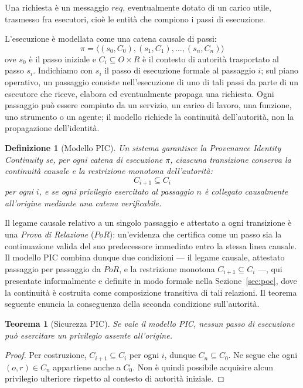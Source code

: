 \documentclass[11pt]{article}
\newtheorem{definition}{Definizione}
\newtheorem{theorem}{Teorema}
\begin{document}
Una richiesta è un messaggio $req$, eventualmente dotato di un carico utile,
trasmesso fra esecutori, cioè le entità che compiono i passi di esecuzione.

L'esecuzione è modellata come una catena causale di passi:
\[
\pi = \langle (s_0, C_0), (s_1, C_1), \dots, (s_n, C_n) \rangle
\]
ove $s_0$ è il passo iniziale e $C_i \subseteq O \times R$ è il contesto di
autorità trasportato al passo $s_i$. Indichiamo con $s_i$ il passo di esecuzione
formale al passaggio $i$; sul piano operativo, un passaggio consiste
nell'esecuzione di uno di tali passi da parte di un esecutore che riceve,
elabora ed eventualmente propaga una richiesta. Ogni passaggio può essere
compiuto da un servizio, un carico di lavoro, una funzione, uno strumento o un
agente; il modello richiede la continuità dell'autorità, non la propagazione
dell'identità.

\begin{definition}[Modello PIC]
Un sistema garantisce la Provenance Identity Continuity se, per ogni catena di
esecuzione $\pi$, ciascuna transizione conserva la continuità causale e la
restrizione monotona dell'autorità:
\[
C_{i+1} \subseteq C_i
\]
per ogni $i$, e se ogni privilegio esercitato al passaggio $n$ è collegato
causalmente all'origine mediante una catena verificabile.
\end{definition}

Il legame causale relativo a un singolo passaggio e attestato a ogni transizione
è una \emph{Prova di Relazione} ($PoR$): un'evidenza che certifica come un passo
sia la continuazione valida del suo predecessore immediato entro la stessa linea
causale. Il modello PIC combina dunque due condizioni --- il legame causale,
attestato passaggio per passaggio da $PoR$, e la restrizione monotona
$C_{i+1}\subseteq C_i$ ---, qui presentate informalmente e definite in modo
formale nella Sezione~\ref{sec:poc}, dove la continuità è costruita come
composizione transitiva di tali relazioni. Il teorema seguente enuncia la
conseguenza della seconda condizione sull'autorità.

\begin{theorem}[Sicurezza PIC]
Se vale il modello PIC, nessun passo di esecuzione può esercitare un privilegio
assente all'origine.
\end{theorem}

\begin{proof}
Per costruzione, $C_{i+1} \subseteq C_i$ per ogni $i$, dunque
$C_n \subseteq C_0$. Ne segue che ogni $(o,r) \in C_n$ appartiene anche a
$C_0$. Non è quindi possibile acquisire alcun privilegio ulteriore rispetto al
contesto di autorità iniziale.
\end{proof}
\end{document}

